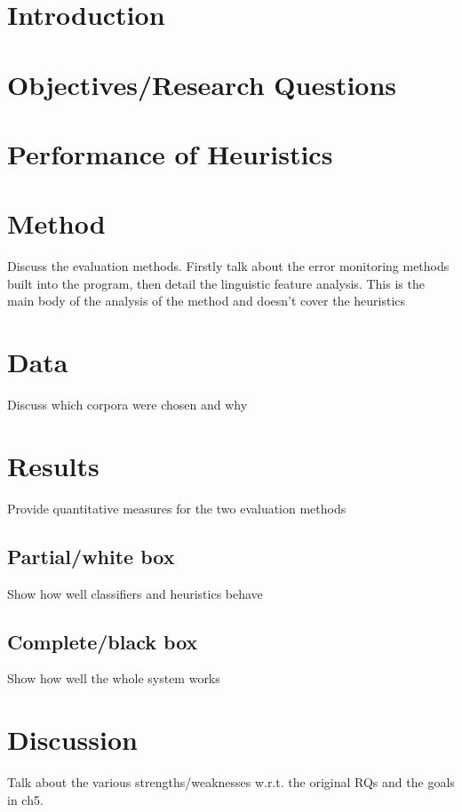\section*{Introduction}
\label{sec:evaluation:introduction}






\section{Objectives/Research Questions}
\label{sec:evaluation:rqs}




\section{Performance of Heuristics}
\label{sec:evaluation:heuristics}



\section{Method}
\label{sec:evaluation:method}
Discuss the evaluation methods.  Firstly talk about the error monitoring methods built into the program, then detail the linguistic feature analysis.  This is the main body of the analysis of the method and doesn't cover the heuristics


\section{Data}
\label{sec:evaluation:method}
Discuss which corpora were chosen and why

\section{Results}
\label{sec:evaluation:}
Provide quantitative measures for the two evaluation methods
\subsection{Partial/white box}
Show how well classifiers and heuristics behave
\subsection{Complete/black box}
Show how well the whole system works


\section{Discussion}
\label{sec:evaluation:discussion}
Talk about the various strengths/weaknesses w.r.t. the original RQs and the goals in ch5.
